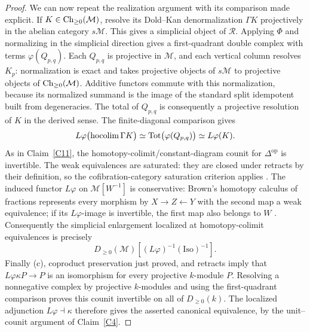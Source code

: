\begin{proof}
We can now repeat the realization argument with its comparison made explicit. If $K\in\operatorname{Ch}_{\geq0}(\mathcal M)$, resolve its Dold--Kan denormalization $\Gamma K$ projectively in the abelian category $s\mathcal M$. This gives a simplicial object of $\mathcal R$. Applying $\Phi$ and normalizing in the simplicial direction gives a first-quadrant double complex with terms $\varphi(Q_{p,q})$. Each $Q_{p,q}$ is projective in $\mathcal M$, and each vertical column resolves $K_p$: normalization is exact and takes projective objects of $s\mathcal M$ to projective objects of $\operatorname{Ch}_{\geq0}(\mathcal M)$. Additive functors commute with this normalization, because its normalized summand is the image of the standard split idempotent built from degeneracies. The total of $Q_{p,q}$ is consequently a projective resolution of $K$ in the derived sense. The finite-diagonal comparison gives
\[
 L\varphi\bigl(\operatorname{hocolim}\Gamma K\bigr)
 \simeq\operatorname{Tot}\bigl(\varphi(Q_{p,q})\bigr)
 \simeq L\varphi(K).
\]
As in Claim~\ref{C11}, the homotopy-colimit/constant-diagram counit for $\Delta^{\mathrm{op}}$ is invertible. The weak equivalences are saturated: they are closed under retracts by their definition, so the cofibration-category saturation criterion applies \citep[Theorem 7.2.7]{RadulescuBanu2009}. The induced functor $L\varphi$ on $\mathcal M[W^{-1}]$ is conservative: Brown's homotopy calculus of fractions represents every morphism by $X\to Z\leftarrow Y$ with the second map a weak equivalence; if its $L\varphi$-image is invertible, the first map also belongs to $W$ \citep[Theorem 6.4.4]{RadulescuBanu2009}. Consequently the simplicial enlargement localized at homotopy-colimit equivalences is precisely
\[
 D_{\geq0}(\mathcal M)[(L\varphi)^{-1}(\mathrm{Iso})^{-1}].
\]
Finally (c), coproduct preservation just proved, and retracts imply that $L\varphi\kappa P\to P$ is an isomorphism for every projective $k$-module $P$. Resolving a nonnegative complex by projective $k$-modules and using the first-quadrant comparison proves this counit invertible on all of $D_{\geq0}(k)$. The localized adjunction $L\varphi\dashv\kappa$ therefore gives the asserted canonical equivalence, by the unit--counit argument of Claim~\ref{C4}.
\end{proof}


